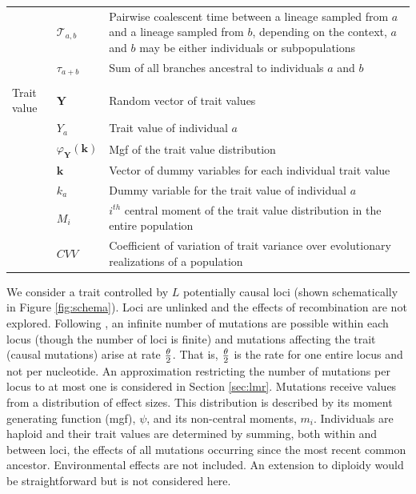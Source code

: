 \begin{table}
\begin{tabular}{l l l}
    & $\mathcal{T}_{a,b}$ & \multicolumn{1}{p{10cm}}{Pairwise coalescent time between a lineage sampled from $a$ and a lineage sampled from $b$, depending on the context, $a$ and $b$ may be either individuals or subpopulations}\\
    & $\tau_{a+b}$ & Sum of all branches ancestral to individuals $a$ and $b$\\
    & & \\
    Trait value & $\mathbf{Y}$ & Random vector of trait values \\
    & $Y_a$ & Trait value of individual $a$\\
    & $\varphi_{\mathbf{Y}}(\mathbf{k})$ & Mgf of the trait value distribution \\
    & $\mathbf{k}$ & \multicolumn{1}{p{10cm}}{Vector of dummy variables for each individual trait value}\\
    & $k_a$ & Dummy variable for the trait value of individual $a$\\
    & $M_i$ & \multicolumn{1}{p{10cm}}{$i^{th}$ central moment of the trait value distribution in the entire population}\\
    & $CVV$ & \multicolumn{1}{p{10cm}}{Coefficient of variation of trait variance over evolutionary realizations of a population}\\
    \hline
  \end{tabular}
  \label{notation}
\end{table}

We consider a trait controlled by $L$ potentially causal loci (shown
schematically in Figure \ref{fig:schema}). Loci are unlinked and the effects of
recombination are not explored. Following \citet{Kimura1969}, an infinite number
of mutations are possible within each locus (though the number of loci is
finite) and mutations affecting the trait (causal mutations) arise at rate $\frac{\theta}{2}$.
That is, $\frac{\theta}{2}$ is the rate for one entire locus and not per nucleotide. An
approximation restricting the number of mutations per locus to at most one is
considered in Section \ref{sec:lmr}. Mutations receive values from a
distribution of effect sizes. This distribution is described by its moment
generating function (mgf), $\psi$, and its non-central moments, $m_i$.
Individuals are haploid and their trait values are determined by summing, both
within and between loci, the effects of all mutations occurring since the most
recent common ancestor. Environmental effects are not included. An extension to
diploidy would be straightforward but is not considered here.

